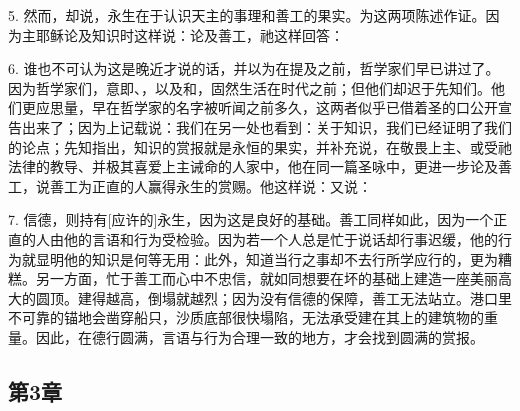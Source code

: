 5. 然而，却说，永生在于认识天主的事理和善工的果实。为这两项陈述作证。因为主耶稣论及知识时这样说：论及善工，祂这样回答：\par

6. 谁也不可认为这是晚近才说的话，并以为在提及之前，哲学家们早已讲过了。因为哲学家们，意即、，以及和，固然生活在时代之前；但他们却迟于先知们。他们更应思量，早在哲学家的名字被听闻之前多久，这两者似乎已借着圣的口公开宣告出来了；因为上记载说：我们在另一处也看到：关于知识，我们已经证明了我们的论点；先知指出，知识的赏报就是永恒的果实，并补充说，在敬畏上主、或受祂法律的教导、并极其喜爱上主诫命的人家中，他在同一篇圣咏中，更进一步论及善工，说善工为正直的人赢得永生的赏赐。他这样说：又说：\par

7. 信德，则持有[应许的]永生，因为这是良好的基础。善工同样如此，因为一个正直的人由他的言语和行为受检验。因为若一个人总是忙于说话却行事迟缓，他的行为就显明他的知识是何等无用：此外，知道当行之事却不去行所学应行的，更为糟糕。另一方面，忙于善工而心中不忠信，就如同想要在坏的基础上建造一座美丽高大的圆顶。建得越高，倒塌就越烈；因为没有信德的保障，善工无法站立。港口里不可靠的锚地会凿穿船只，沙质底部很快塌陷，无法承受建在其上的建筑物的重量。因此，在德行圆满，言语与行为合理一致的地方，才会找到圆满的赏报。\par


\subsection{第3章}

\par

